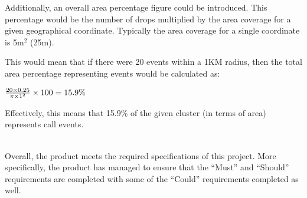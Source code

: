 Additionally, an overall area percentage figure could be introduced. This 
percentage would be the number of drops multiplied by the area coverage for a
given geographical coordinate. Typically the area coverage for a single 
coordinate is 5m$^2$ (25m). 

This would mean that if there were 20 events within a 1KM radius, then the 
total area percentage representing events would be calculated as:

\begin{center}
  $ \large \frac{20 \times 0.25}{\pi \times 1^2} \times 100 = 15.9\% $
\end{center}

Effectively, this means that 15.9\% of the given cluster (in terms of area) 
represents call events.

~\\

Overall, the product meets the required specifications of this project. More 
specifically, the product has managed to ensure that the ``Must'' and 
``Should'' requirements are completed with some of the ``Could'' requirements
completed as well.
